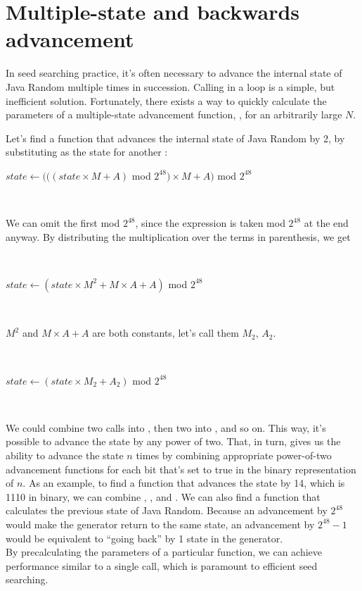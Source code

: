 \documentclass{article}
\begin{document}
\section{Multiple-state and backwards advancement}

In seed searching practice, it’s often necessary to advance the internal state of Java Random multiple times in succession. Calling  in a loop is a simple, but inefficient solution. Fortunately, there exists a way to quickly calculate the parameters of a multiple-state advancement function, , for an arbitrarily large $N$.

Let’s find a function that advances the internal state of Java Random by 2, by substituting  as the state for another :

\begin{algorithmic}
    \State $state \gets (((state \times M + A)$ mod $2^{48}) \times M + A)$ mod $2^{48}$
\EndFunction
\end{algorithmic}
\ \

\noindent We can omit the first mod $2^{48}$, since the expression is taken mod $2^{48}$ at the end anyway. By distributing the multiplication over the terms in parenthesis, we get

\
\begin{algorithmic}
    \State $state \gets (state \times M^2 + M \times A + A)$ mod $2^{48}$
\EndFunction
\end{algorithmic}
\ \

\noindent $M^2$ and $M \times A + A$ are both constants, let’s call them $M_2$, $A_2$.

\
\begin{algorithmic}
\Function{advanceBy2}{} 
    \State $state \gets (state \times M_2 + A_2)$ mod $2^{48}$
\EndFunction
\end{algorithmic}
\ \

We could combine two  calls into , then two  into , and so on. This way, it’s possible to advance the state by any power of two. That, in turn, gives us the ability to advance the state $n$ times by combining appropriate power-of-two advancement functions for each bit that’s set to true in the binary representation of $n$.
As an example, to find a function that advances the state by 14, which is 1110 in binary, we can combine , , and . 
We can also find a function that calculates the previous state of Java Random. Because an advancement by $2^{48}$ would make the generator return to the same state, an advancement by $2^{48}-1$ would be equivalent to “going back” by 1 state in the generator. \\
By precalculating the parameters of a particular \Call{advanceByN}{} function, we can achieve performance similar to a single \Call{nextSeed}{} call, which is paramount to efficient seed searching.
\end{document}
